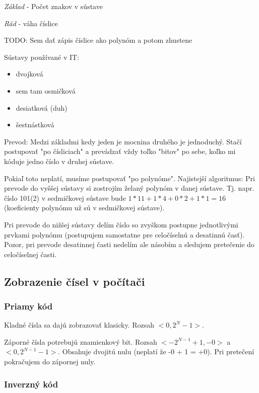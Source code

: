 \documentclass[a4paper,10pt]{article}
\begin{document}
\begin{multicols}{2}
		\emph{Základ} - Počet znakov v sústave
		
		\emph{Rád} - váha číslice
		
		TODO: Sem dať zápis číslice ako polynóm a potom zhustene
		
		Sústavy používané v IT:
		
		\begin{itemize}
			\item dvojková
			\item sem tam osmičková
			\item desiatková (duh)
			\item šestnástková
		\end{itemize}
		
		Prevod: Medzi základmi kedy jeden je mocnina druhého je jednoduchý. Stačí postupovať "po čísliciach" a prevádzať vždy toľko "bitov" po sebe, koľko mi kóduje jedno číslo v druhej sústave. 
		
		Pokiaľ toto neplatí, musíme postupovať "po polynóme". Najistejší algoritmus:
		Pri prevode do vyššej sústavy si zostrojím želaný polynóm v danej sústave. Tj. napr. číslo 101(2) v sedmičkovej sústave bude $1 * 11 + 1 * 4 + 0 * 2 + 1 * 1 = 16$ (koeficienty polynómu už sú v sedmičkovej sústave). 
		
		Pri prevode do nižšej sústavy delím číslo so zvyškom postupne jednotlivými prvkami polynómu (postupujem samostatne pre celočíselnú a desatinnú časť). Pozor, pri prevode desatinnej časti nedelím ale násobím a sledujem pretečenie do celočíselnej časti.
		
	\subsection{Zobrazenie čísel v počítači}
	
		\subsubsection{Priamy kód}
		
			Kladné čísla sa dajú zobrazovať klasicky. Rozsah $<0, 2^N-1>$.
			
			Záporné čísla potrebujú znamienkový bit. Rozsah $<-2^{N-1} + 1, -0>$ a $<0, 2^{N-1} - 1>$. Obsahuje dvojitú nulu (neplatí že -0 + 1 = +0). Pri pretečení pokračujem do zápornej nuly.

		\subsubsection{Inverzný kód}
		

\end{multicols}
\end{document}
